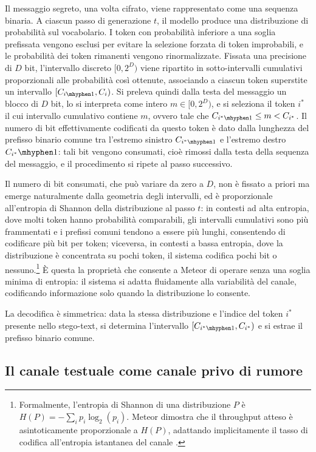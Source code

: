 Il messaggio segreto, una volta cifrato, viene rappresentato come una sequenza binaria. A ciascun passo di generazione $t$, il modello produce una distribuzione di probabilità sul vocabolario. I token con probabilità inferiore a una soglia prefissata vengono esclusi per evitare la selezione forzata di token improbabili, e le probabilità dei token rimanenti vengono rinormalizzate. Fissata una precisione di $D$ bit, l'intervallo discreto $[0, 2^D)$ viene ripartito in sotto-intervalli cumulativi proporzionali alle probabilità così ottenute, associando a ciascun token superstite un intervallo $[C_{i\mhyphen1}, C_i)$. Si preleva quindi dalla testa del messaggio un blocco di $D$ bit, lo si interpreta come intero $m \in [0, 2^D)$, e si seleziona il token $i^*$ il cui intervallo cumulativo contiene $m$, ovvero tale che $C_{i^*\mhyphen1} \le m < C_{i^*}$. Il numero di bit effettivamente codificati da questo token è dato dalla lunghezza del prefisso binario comune tra l'estremo sinistro $C_{i^*\mhyphen1}$ e l'estremo destro $C_{i^*}\mhyphen1$: tali bit vengono consumati, cioè rimossi dalla testa della sequenza del messaggio, e il procedimento si ripete al passo successivo.

Il numero di bit consumati, che può variare da zero a $D$, non è fissato a priori ma emerge naturalmente dalla geometria degli intervalli, ed è proporzionale all'entropia di Shannon della distribuzione al passo $t$: in contesti ad alta entropia, dove molti token hanno probabilità comparabili, gli intervalli cumulativi sono più frammentati e i prefissi comuni tendono a essere più lunghi, consentendo di codificare più bit per token; viceversa, in contesti a bassa entropia, dove la distribuzione è concentrata su pochi token, il sistema codifica pochi bit o nessuno.\footnote{Formalmente, l'entropia di Shannon di una distribuzione $P$ è $H(P) = -\sum_{i} p_i \log_2(p_i)$. Meteor dimostra che il throughput atteso è asintoticamente proporzionale a $H(P)$, adattando implicitamente il tasso di codifica all'entropia istantanea del canale \cite{kaptchuk-2021}.} È questa la proprietà che consente a Meteor di operare senza una soglia minima di entropia: il sistema si adatta fluidamente alla variabilità del canale, codificando informazione solo quando la distribuzione lo consente.

La decodifica è simmetrica: data la stessa distribuzione e l'indice del token $i^*$ presente nello stego-text, si determina l'intervallo $[C_{i^*\mhyphen1}, C_{i^*})$ e si estrae il prefisso binario comune.

\subsection{Il canale testuale come canale privo di rumore}\label{sec:canale-testuale}

